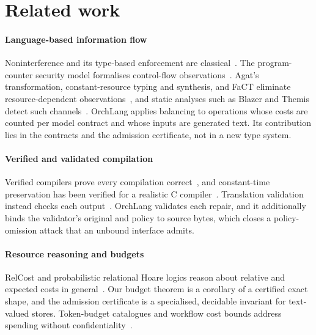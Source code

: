 \documentclass[preprint,12pt]{elsarticle}
\theoremstyle{definition}
\begin{document}


\section{Related work}\label{sec:related}

\paragraph{Language-based information flow}
Noninterference and its type-based enforcement are
classical~\cite{goguen1982noninterference,volpano1996sound,sabelfeld2003language}.
The program-counter security model formalises control-flow
observations~\cite{molnar2005pc}. Agat's transformation, constant-resource typing
and synthesis, and FaCT eliminate resource-dependent
observations~\cite{agat2000transforming,ngo2017constant,cauligi2019fact}, and
static analyses such as Blazer and Themis detect such
channels~\cite{antonopoulos2017blazer,chen2017themis}. OrchLang applies balancing to
operations whose costs are counted per model contract and whose inputs are
generated text. Its contribution lies in the contracts and the admission
certificate, not in a new type system.

\paragraph{Verified and validated compilation}
Verified compilers prove every compilation
correct~\cite{leroy2009compcert}, and constant-time preservation has been verified
for a realistic C compiler~\cite{barthe2020ctcompcert,barthe2021constantresource}.
Translation validation instead checks each output~\cite{pnueli1998tv,necula2000tv}.
OrchLang validates each repair, and it additionally binds the validator's original
and policy to source bytes, which closes a policy-omission attack that an unbound
interface admits.

\paragraph{Resource reasoning and budgets}
RelCost and probabilistic relational Hoare logics reason about relative and
expected costs in general~\cite{cicek2017relcost,avanzini2025erhl}. Our budget
theorem is a corollary of a certified exact shape, and the admission certificate
is a specialised, decidable invariant for text-valued stores. Token-budget
catalogues and workflow cost bounds address spending without
confidentiality~\cite{khan2026budgets,dickerson2026loom,costwright2026,typedresources2026}.
\end{document}
